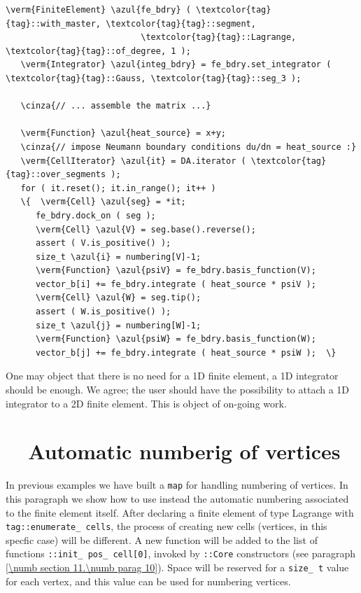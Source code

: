 \begin{Verbatim}[commandchars=\\\{\},formatcom=\small\tt,frame=single,
   label=parag-\ref{\numb section 6.\numb parag 3}.cpp,rulecolor=\color{coment},
   baselinestretch=0.94,framesep=2mm                                            ]
   \verm{FiniteElement} \azul{fe_bdry} ( \textcolor{tag}{tag}::with_master, \textcolor{tag}{tag}::segment,
                           \textcolor{tag}{tag}::Lagrange, \textcolor{tag}{tag}::of_degree, 1 );
   \verm{Integrator} \azul{integ_bdry} = fe_bdry.set_integrator ( \textcolor{tag}{tag}::Gauss, \textcolor{tag}{tag}::seg_3 );

   \cinza{// ... assemble the matrix ...}

   \verm{Function} \azul{heat_source} = x+y;
   \cinza{// impose Neumann boundary conditions du/dn = heat_source :}
   \verm{CellIterator} \azul{it} = DA.iterator ( \textcolor{tag}{tag}::over_segments );
   for ( it.reset(); it.in_range(); it++ )
   \{  \verm{Cell} \azul{seg} = *it;
      fe_bdry.dock_on ( seg );
      \verm{Cell} \azul{V} = seg.base().reverse();
      assert ( V.is_positive() );
      size_t \azul{i} = numbering[V]-1;
      \verm{Function} \azul{psiV} = fe_bdry.basis_function(V);
      vector_b[i] += fe_bdry.integrate ( heat_source * psiV );
      \verm{Cell} \azul{W} = seg.tip();
      assert ( W.is_positive() );
      size_t \azul{j} = numbering[W]-1;
      \verm{Function} \azul{psiW} = fe_bdry.basis_function(W);
      vector_b[j] += fe_bdry.integrate ( heat_source * psiW );  \}
\end{Verbatim}

One may object that there is no need for a 1D finite element, a 1D integrator should be enough.
We agree; the user should have the possibility to attach a 1D integrator to a 2D finite element.
This is object of on-going work.


\section{~~Automatic numberig of vertices}\label{\numb section 6.\numb parag 4}

In previous examples we have built a {\small\tt map} for handling numbering of vertices.
In this paragraph we show how to use instead the automatic numbering associated to the
finite element itself.
After declaring a finite element of type Lagrange with
{\small\tt\textcolor{tag}{tag}::enumerate\_\,cells},
the process of creating new cells (vertices, in this specfic case) will be different.
A new function will be added to the list of functions
{\small\tt{}::init\_\,pos\_\,cell[0]},
invoked by {\small\tt{}::Core} constructors
(see paragraph \ref{\numb section 11.\numb parag 10}).
Space will be reserved for a {\small\tt size\_\,t} value for each vertex, and
this value can be used for numbering vertices.

